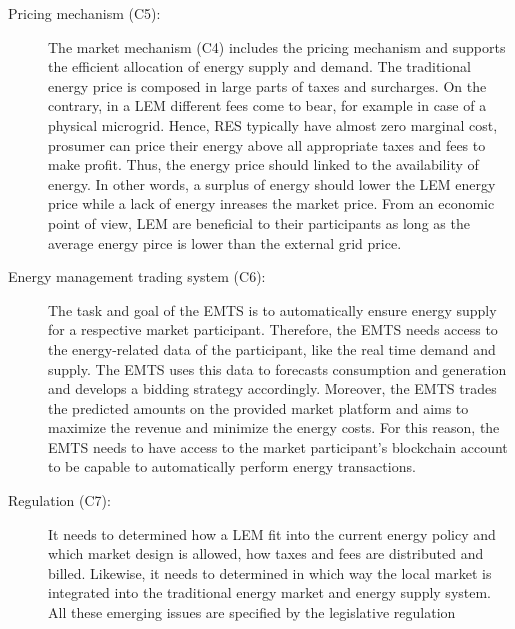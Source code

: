 \begin{description}
    \item[Pricing mechanism (C5):] The market mechanism (C4) includes the pricing mechanism 
     and supports the efficient allocation of energy supply and demand. 
     The traditional energy price is composed in large parts of taxes and surcharges.
     On the contrary, in a LEM different fees come to bear, for example in case of a 
     physical microgrid. Hence, RES typically have almost zero marginal cost, prosumer can 
     price their energy above all appropriate taxes and fees to make profit. 
    Thus, the energy price should linked to the availability of energy. In other words,
    a surplus of energy should lower the LEM energy price while a lack of energy inreases the 
    market price. From an economic point of view, LEM are beneficial to their 
    participants as long as the average energy pirce is lower than the external grid price.
        
    \item[Energy management trading system (C6):] The task and goal of the EMTS
     is to automatically ensure energy supply for a respective market participant.
     Therefore, the EMTS needs access to the energy-related data of the participant, like 
     the real time demand and supply. The EMTS uses this data to forecasts consumption and
     generation and develops a bidding strategy accordingly. 
     Moreover, the EMTS trades the predicted amounts on the provided market platform 
     and aims to maximize the revenue and minimize the energy costs. 
     For this reason, the EMTS needs to have access to the market participant’s
     blockchain account to be capable to automatically perform energy transactions.

    \item[Regulation (C7):] It needs to determined how a LEM 
     fit into the current energy policy and which market design is allowed, how 
     taxes and fees are distributed and billed. Likewise, it needs to 
     determined in which way the local market is integrated into the traditional
     energy market and energy supply system.
     All these emerging issues are specified by the legislative regulation
    
\end{description}

\clearpage